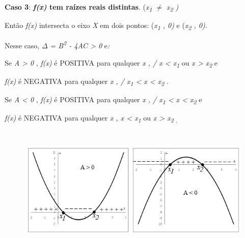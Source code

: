 \textbf{Caso 3}: \textbf{\textit{f(x)}  tem raízes reais distintas}.  (\textit{x\textsubscript{1} $ \neq $  x\textsubscript{2} )}   

Então \textit{f(x)}  intersecta o eixo \textit{X} em dois pontos: (\textit{x\textsubscript{1} , 0)}   e  (\textit{x\textsubscript{2} , 0).}   

Nesse caso, \textit{$ \Delta $  = B\textsuperscript{2} - 4AC > 0   }e\textit{:  }

Se \textit{A > 0} ,   \textit{f(x)} é POSITIVA para qualquer \textit{x   , / x < x\textsubscript{1  }}ou\textit{ x > x\textsubscript{2  }}e

\textit{f(x)} é NEGATIVA para qualquer \textit{x   , / x\textsubscript{1  }< x < x\textsubscript{2  }}.

Se \textit{A < 0} ,   \textit{f(x)} é POSITIVA para qualquer \textit{x   , / x\textsubscript{1  }< x < x\textsubscript{2  }}e

\textit{f(x)} é NEGATIVA para qualquer \textit{x   , x < x\textsubscript{1  }}ou\textit{ x > x\textsubscript{2  . }}

\begin{figure}[H]
	\begin{Center}
		\includegraphics[width=5.83in,height=2.4in]{capitulos/funcao_do_segundo_grau/media/image14.png}
	\end{Center}
\end{figure}

